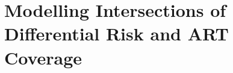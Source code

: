 \chapter{Modelling Intersections of Differential Risk and ART Coverage}\label{art}




\printchapterbibliography